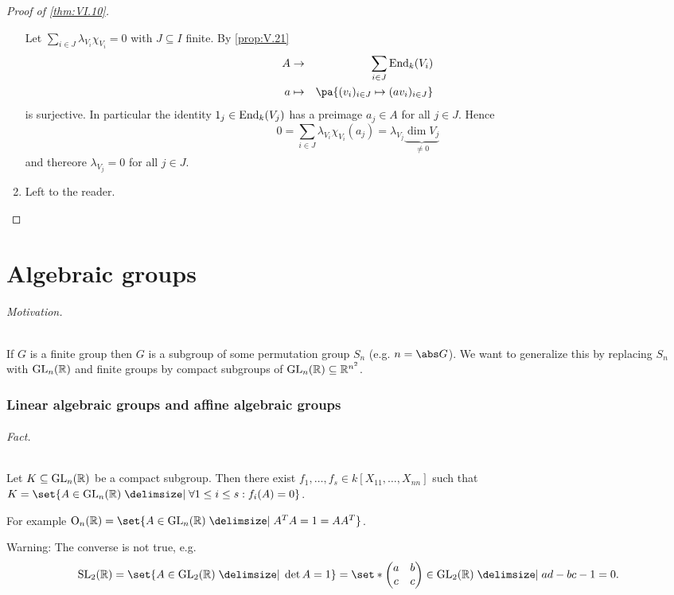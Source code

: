 \documentclass[12pt,a4paper]{scrartcl}
\theoremstyle{cplain}
\theoremstyle{cplain}
\theoremstyle{cplain}
\theoremstyle{definition}
\begin{document}
\begin{otherlanguage}{english}
\begin{proof}[Proof of \cref{thm:VI.10}]
\begin{enumerate}[label=\ref{thm:VI.10:\arabic*}]
    Let $\sum_{i\in J}\lambda_{V_i}\chi_{V_i} = 0$ with $J \subseteq I $ finite. By \cref{prop:V.21}
    \begin{eqnarray*}
      A &\to& \sum_{i\in J}\End_k(V_i) \\
      a&\mapsto& \pa{(v_i)_{i\in J} \mapsto (av_i)_{i\in J} }
    \end{eqnarray*}
    is surjective. In particular the identity $1_j \in \operatorname{End}_k(V_j)$ has a preimage $a_j \in A$ for all $j\in J$. Hence \[0 = \sum_{i\in J}\lambda_{V_i} \chi_{V_i}(a_j) = \lambda_{V_j} \underbrace{\dim V_j}_{\neq 0} \] and thereore $\lambda_{V_j} = 0$ for all $j \in J$.
    \item Left to the reader.
    \qedhere
  \end{enumerate}
\end{proof}



\newpage
\part*{Algebraic groups}

\paragraph{Motivation.}
If $G$ is a finite group then $G$ is a subgroup of some permutation group $S_n$ (e.g. $n = \abs G$). We want to generalize this by replacing $S_n$ with $\operatorname{GL}_n(\mathbb R)$ and finite groups by compact subgroups of $\operatorname{GL}_n(\mathbb R) \subseteq \mathbb R^{n^2}$.

\section{Linear algebraic groups and affine algebraic groups}

\paragraph{Fact.}
Let $K\subseteq \operatorname{GL}_n(\mathbb R)$ be a compact subgroup. Then there exist $f_1,\ldots,f_s \in k[X_{11},\ldots,X_{nn}]$ such that $K = \set{A\in\GL_n(\IR) \given \forall 1\le i\le s : f_i(A) = 0 }$.

\medskip

For example $\OO_n(\IR) = \set{A \in \GL_n(\IR) \given A^TA = 1 = AA^T}$.

\medskip

Warning: The converse is not true, e.g. \[ \SL_2(\IR) = \set{A \in \GL_2(\IR) \given \det A = 1} = \set*{\mat{a&b\\c&c} \in \GL_2(\IR) \given ad-bc-1=0}. \]


\end{otherlanguage}
\end{document}
